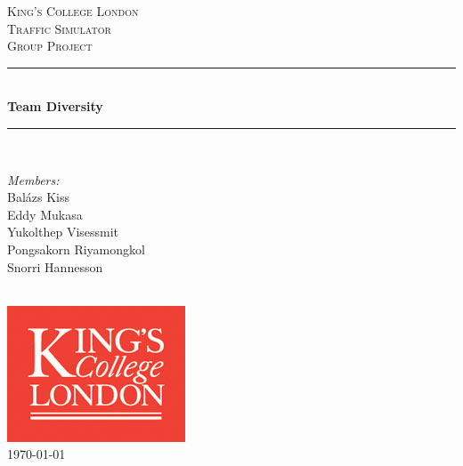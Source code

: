 \documentclass[11pt]{article}
\begin{document}

\begin{titlepage}

\newcommand{\HRule}{\rule{\linewidth}{0.5mm}}
\center
\textsc{\LARGE King's College London}\\[1.5cm]
\textsc{\Large Traffic Simulator}\\[0.5cm]
\textsc{\large Group Project}\\[0.5cm]
\HRule \\[0.4cm]
{ \huge \bfseries Team Diversity}\\[0.4cm]
\HRule \\[1.5cm]

\begin{minipage}{0.4\textwidth} \large
\begin{center}
\emph{Members:}\\
Balázs Kiss \\
Eddy Mukasa \\
Yukolthep Visessmit \\
Pongsakorn Riyamongkol \\
Snorri Hannesson
\end{center}
\end{minipage}
\\[2cm]

\includegraphics{KingsLogo}\\[1cm] 

{\large \today}\\[3cm]

\vfill

\end{titlepage}


\tableofcontents
\end{document}
